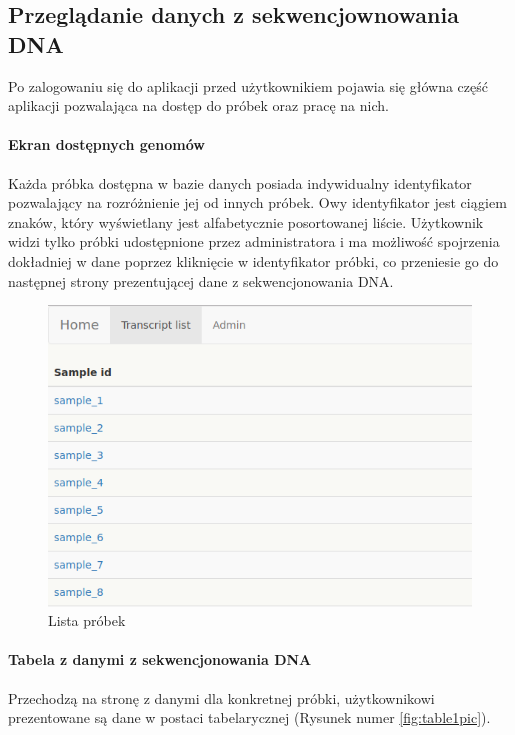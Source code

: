 \documentclass[a4paper,12pt,twoside]{article}
\begin{document}
\newpage  
\subsection{Przeglądanie danych z sekwencjownowania DNA} \label{sssec:dnaPage}
Po zalogowaniu się do aplikacji przed użytkownikiem pojawia się główna część aplikacji pozwalająca na dostęp do próbek oraz pracę na nich. 
 
\paragraph{Ekran dostępnych genomów}
Każda próbka dostępna w bazie danych posiada indywidualny identyfikator pozwalający na 
rozróżnienie jej od innych próbek. Owy identyfikator jest ciągiem znaków, który wyświetlany jest 
alfabetycznie posortowanej liście. Użytkownik widzi tylko próbki udostępnione przez administratora
i ma możliwość spojrzenia dokładniej w dane poprzez kliknięcie w identyfikator próbki,
co przeniesie go do następnej strony prezentującej dane z sekwencjonowania DNA. 


\begin{figure}[h!]
  \includegraphics[width=\linewidth]{obrazy/aplikacja/sample_list.png}
  \caption{Lista próbek}
  \label{fig:sample_listpic}
\end{figure}

\newpage
\paragraph{Tabela z danymi z sekwencjonowania DNA} 
Przechodzą na stronę z danymi dla konkretnej próbki, użytkownikowi prezentowane są 
dane w postaci tabelarycznej (Rysunek numer \ref{fig:table1pic}).
\end{document}
